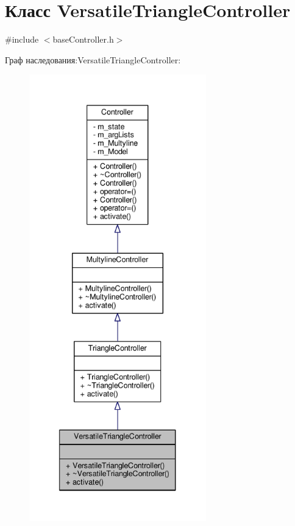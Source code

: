 \hypertarget{class_versatile_triangle_controller}{\section{Класс Versatile\-Triangle\-Controller}
\label{class_versatile_triangle_controller}
}


{\ttfamily \#include $<$base\-Controller.\-h$>$}



Граф наследования\-:Versatile\-Triangle\-Controller\-:
\nopagebreak
\begin{figure}[H]
\begin{center}
\leavevmode
\includegraphics[height=550pt]{class_versatile_triangle_controller__inherit__graph}
\end{center}
\end{figure}


